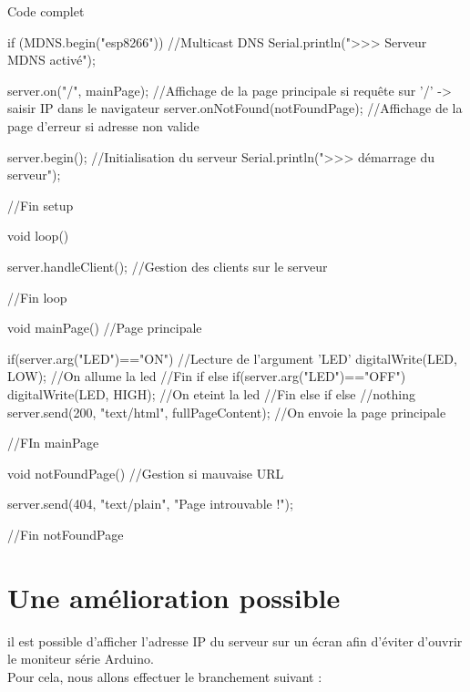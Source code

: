 \begin{Cpp}{Code complet}
{    if (MDNS.begin("esp8266")) {   //Multicast DNS 
        Serial.println(">>> Serveur MDNS activé");
    }
    
    server.on("/", mainPage);           //Affichage de la page principale si requête sur '/' -> saisir IP dans le navigateur
    server.onNotFound(notFoundPage);    //Affichage de la page d'erreur si adresse non valide
    
    server.begin();                     //Initialisation du serveur
    Serial.println(">>> démarrage du serveur");
      
}//Fin setup
    
void loop() 
{
      
    server.handleClient(); //Gestion des clients sur le serveur
     
}//Fin loop
    
    
void mainPage() //Page principale
{ 
    
    if(server.arg("LED")=="ON") //Lecture de l'argument 'LED'
    {
         digitalWrite(LED, LOW); //On allume la led
    }//Fin if
    else if(server.arg("LED")=="OFF")
    {
        digitalWrite(LED, HIGH);   //On eteint la led
    }//Fin else if
    else {
     //nothing
    }
    server.send(200, "text/html", fullPageContent); //On envoie la page principale
      
}//FIn mainPage
    
    
void notFoundPage()  //Gestion si mauvaise URL
{
    server.send(404, "text/plain", "Page introuvable !\n\n");
      
}//Fin notFoundPage

\end{Cpp}

\section{Une amélioration possible}

il est possible d'afficher l'adresse IP du serveur sur un écran  afin d'éviter d'ouvrir le moniteur série Arduino.\\
Pour cela, nous allons effectuer le branchement suivant : 


